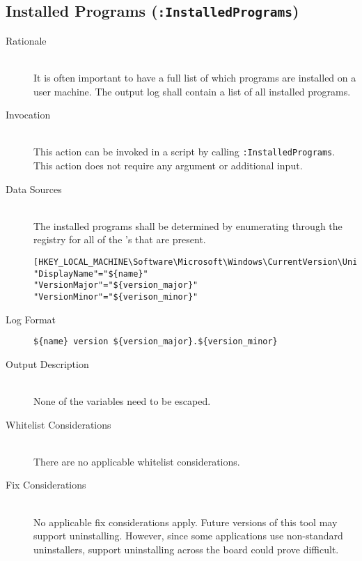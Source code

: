 \subsection{Installed Programs (\texttt{:InstalledPrograms})}
\begin{description}
\item[Rationale] \hfill \\
It is often important to have a full list of which programs are installed on a
user machine.  The output log shall contain a list of all installed programs. 
\item[Invocation] \hfill \\
This action can be invoked in a script by calling \verb|:InstalledPrograms|.
This action does not require any argument or additional input. 
\item[Data Sources] \hfill \\
The installed programs shall be determined by enumerating through the registry
for all of the 's that are present.
\vspace{-\baselineskip}
\begin{verbatim}
[HKEY_LOCAL_MACHINE\Software\Microsoft\Windows\CurrentVersion\Uninstall\${id}]
"DisplayName"="${name}"
"VersionMajor"="${version_major}"
"VersionMinor"="${verison_minor}"
\end{verbatim}
\item[Log Format] \hfill 
\vspace{-\baselineskip}
\begin{verbatim}
${name} version ${version_major}.${version_minor}
\end{verbatim}
\item[Output Description] \hfill \\
None of the variables need to be escaped.
\item[Whitelist Considerations] \hfill \\
There are no applicable whitelist considerations.
\item[Fix Considerations] \hfill \\
No applicable fix considerations apply.  Future versions of this tool may
support uninstalling.  However, since some applications use non-standard
uninstallers, support uninstalling across the board could prove difficult.
\end{description}
